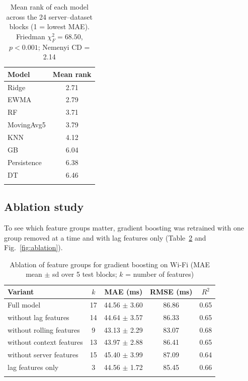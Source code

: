 \documentclass[pdflatex,sn-mathphys-num]{sn-jnl}
\begin{document}
\begin{table}[h]
\caption{Mean rank of each model across the 24 server--dataset blocks (1 = lowest MAE). Friedman $\chi^2_F = 68.50$, $p < 0.001$; Nemenyi CD = 2.14}\label{tab:friedman}
\centering
\footnotesize
\begin{tabular}{@{}lc@{}}
\toprule
Model & Mean rank \\
\midrule
Ridge & 2.71 \\
EWMA & 2.79 \\
RF & 3.71 \\
MovingAvg5 & 3.79 \\
KNN & 4.12 \\
GB & 6.04 \\
Persistence & 6.38 \\
DT & 6.46 \\
\botrule
\end{tabular}
\end{table}

\subsection{Ablation study}\label{sec:ablation}

To see which feature groups matter, gradient boosting was retrained with one group removed at a time and with lag features only (Table~\ref{tab:ablation} and Fig.~\ref{fig:ablation}).

\begin{table}[h]
\caption{Ablation of feature groups for gradient boosting on Wi-Fi (MAE mean $\pm$ sd over 5 test blocks; $k$ = number of features)}\label{tab:ablation}
\centering
\footnotesize
\begin{tabular}{@{}lcccc@{}}
\toprule
Variant & $k$ & MAE (ms) & RMSE (ms) & $R^2$ \\
\midrule
Full model & 17 & 44.56 $\pm$ 3.60 & 86.86 & 0.65 \\
without lag features & 14 & 44.64 $\pm$ 3.57 & 86.33 & 0.65 \\
without rolling features & 9 & 43.13 $\pm$ 2.29 & 83.07 & 0.68 \\
without context features & 13 & 43.97 $\pm$ 2.88 & 86.41 & 0.65 \\
without server features & 15 & 45.40 $\pm$ 3.99 & 87.09 & 0.64 \\
lag features only & 3 & 44.56 $\pm$ 1.72 & 85.45 & 0.66 \\
\botrule
\end{tabular}
\end{table}
\end{document}
